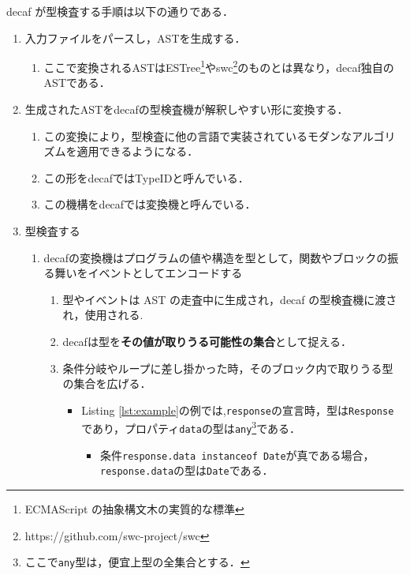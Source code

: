 decaf が型検査する手順は以下の通りである．

\begin{enumerate}
    \item 入力ファイルをパースし，ASTを生成する．
          \begin{enumerate}
              \item ここで変換されるASTはESTree\footnote{ECMAScript の抽象構文木の実質的な標準}やswc\footnote{https://github.com/swc-project/swc}のものとは異なり，decaf独自のASTである．
          \end{enumerate}
    \item 生成されたASTをdecafの型検査機が解釈しやすい形に変換する．
          \begin{enumerate}
              \item この変換により，型検査に他の言語で実装されているモダンなアルゴリズムを適用できるようになる．
              \item この形をdecafではTypeIDと呼んでいる．
              \item この機構をdecafでは変換機と呼んでいる．
          \end{enumerate}
    \item 型検査する
          \begin{enumerate}
              \item decafの変換機はプログラムの値や構造を型として，関数やブロックの振る舞いをイベントとしてエンコードする
                    \begin{enumerate}
                        \item 型やイベントは AST の走査中に生成され，decaf の型検査機に渡され，使用される.
                        \item decafは型を\textbf{その値が取りうる可能性の集合}として捉える．
                        \item 条件分岐やループに差し掛かった時，そのブロック内で取りうる型の集合を広げる．
                              \begin{itemize}
                                  \item Listing \ref{lst:example}の例では,\texttt{response}の宣言時，型は\texttt{Response}であり，プロパティ\texttt{data}の型は\texttt{any}\footnote{ここで\texttt{any}型は，便宜上型の全集合とする．}である．
                                        \begin{itemize}
                                            \item 条件\texttt{response.data instanceof Date}が真である場合，\texttt{response.data}の型は\texttt{Date}である．

\end{itemize}
\end{itemize}
\end{enumerate}
\end{enumerate}
\end{enumerate}
